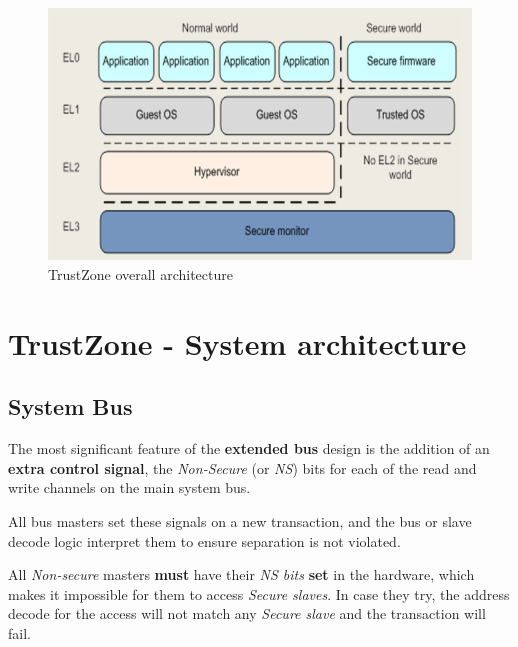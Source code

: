 \begin{figure}[htbp]
   \centering
   \includegraphics{images/TrustZone_architecture.png}
   \caption{TrustZone overall architecture}
   \label{fig:TrustZone_architecture}
\end{figure}

\section{TrustZone - System architecture}
\subsection{System Bus}

The most significant feature of the \textbf{extended bus} design is the addition of an
\textbf{extra control signal}, the \textit{Non-Secure} (or \textit{NS}) bits for each of the read and write
channels on the main system bus.

All bus masters set these signals on a new transaction, and the bus or slave
decode logic interpret them to ensure separation is not violated.

All \textit{Non-secure} masters \textbf{must} have their \textit{NS bits} \textbf{set} in the hardware, which
makes it impossible for them to access \textit{Secure slaves}.
In case they try, the address decode for
the access will not match any \textit{Secure slave} and the transaction will fail.


